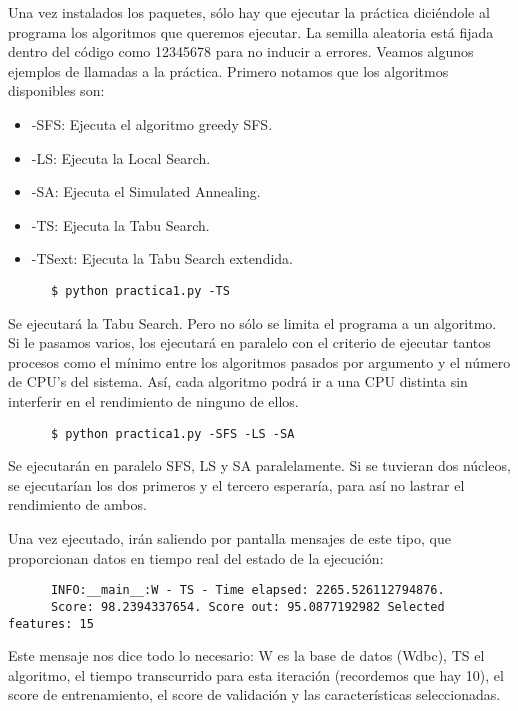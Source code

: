\documentclass[a4paper, 11pt]{article}
\begin{document}
    Una vez instalados los paquetes, sólo hay que ejecutar la práctica diciéndole al programa los algoritmos que queremos ejecutar. La semilla aleatoria está fijada dentro del código como 12345678 para no inducir a errores. Veamos algunos ejemplos de llamadas a la práctica. Primero notamos que los algoritmos disponibles son:

    \begin{itemize}
      \item -SFS: Ejecuta el algoritmo greedy SFS.
      \item -LS: Ejecuta la Local Search.
      \item -SA: Ejecuta el Simulated Annealing.
      \item -TS: Ejecuta la Tabu Search.
      \item -TSext: Ejecuta la Tabu Search extendida.
    \end{itemize}

    \begin{verbatim}
      $ python practica1.py -TS
    \end{verbatim}
    Se ejecutará la Tabu Search. Pero no sólo se limita el programa a un algoritmo. Si le pasamos varios, los ejecutará en paralelo con el criterio de ejecutar tantos procesos como el mínimo entre los algoritmos pasados por argumento y el número de CPU's del sistema. Así, cada algoritmo podrá ir a una CPU distinta sin interferir en el rendimiento de ninguno de ellos.

    \begin{verbatim}
      $ python practica1.py -SFS -LS -SA
    \end{verbatim}
    Se ejecutarán en paralelo SFS, LS y SA paralelamente. Si se tuvieran dos núcleos, se ejecutarían los dos primeros y el tercero esperaría, para así no lastrar el rendimiento de ambos.

    Una vez ejecutado, irán saliendo por pantalla mensajes de este tipo, que proporcionan datos en tiempo real del estado de la ejecución:

    \begin{verbatim}
      INFO:__main__:W - TS - Time elapsed: 2265.526112794876.
      Score: 98.2394337654. Score out: 95.0877192982 Selected features: 15
    \end{verbatim}

    Este mensaje nos dice todo lo necesario: W es la base de datos (Wdbc), TS el algoritmo, el tiempo transcurrido para esta iteración (recordemos que hay 10), el score de entrenamiento, el score de validación y las características seleccionadas.
\end{document}
